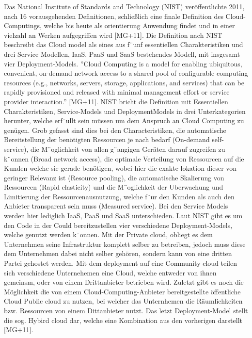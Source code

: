 Das National Institute of Standards and Technology (NIST) veröffentlichte 2011, nach 16 vorausgehenden Definitionen, schließlich eine finale Definition des Cloud-Computings, welche bis heute als orientierung Anwendung findet und in einer vielzahl an Werken aufgegriffen wird [MG+11]. Die Definition nach NIST beschreibt das Cloud model als eines aus f¨unf essentiellen Charakteristiken und drei Service Modellen, IaaS, PaaS und SaaS bestehendes Modell, mit insgesamt vier Deployment-Models. ”Cloud Computing is a model for enabling ubiquitous, convenient, on-demand network access to a shared pool of configurable computing resources (e.g., networks, servers, storage, applications, and services) that can be rapidly provisioned and released with minimal management effort or service provider interaction.” [MG+11]. NIST bricht die Definition mit Essentiellen Charakteristiken, Service-Models und DeploymentModels in drei Unterkategorien herunter, welche erf¨ullt sein müssen um dem Anspruch an Cloud Computing zu genügen. Grob gefasst sind dies bei den Characteristiken, die automatische Bereitstellung der benötigten Ressourcen je nach bedarf (On-demand self-service), die M¨oglichkeit von allen g¨angigen Geräten darauf zugreifen zu k¨onnen (Broad network access), die optimale Verteilung von Ressourcen auf die Kunden welche sie gerade benötigen, wobei hier die exakte lokation dieser von geringer Relevanz ist (Resource pooling), die automatische Skalierung von Ressourcen (Rapid elasticity) und die M¨oglichkeit der Uberwachung und Limitierung der Ressourcenausnutzung, welche f¨ur den Kunden als auch den Anbieter transparent sein muss (Measured service). Bei den Service Models werden hier lediglich IaaS, PaaS und SaaS unterschieden. Laut NIST gibt es um den Code in der Could bereitzustellen vier verschiedene Deployment-Models, welche genutzt werden k¨onnen. Mit der Private cloud, obliegt es dem Unternehmen seine Infrastruktur komplett selber zu betreiben, jedoch muss diese dem Unternehmen dabei nicht selber gehören, sondern kann von eine dritten Partei gehostet werden. Mit dem deployment auf eine Community cloud teilen sich verschiedene Unternehemen eine Cloud, welche entweder von ihnen gemeinsm, oder von einem Drittanbieter betrieben wird. Zuletzt gibt es noch die Möglichkeit die von einem Cloud-Computing-Anbieter bereitgestellte öffentliche Cloud Public cloud zu nutzen, bei welcher das Unternhemen die Räumlichkeiten bzw. Ressourcen von einem Dittanbieter nutzt. Das letzt Deployment-Model stellt die sog. Hybird cloud dar, welche eine Kombination aus den vorherigen darstellt [MG+11].




